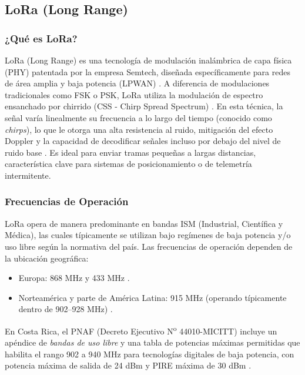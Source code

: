 \documentclass[conference]{IEEEtran}
\begin{document}
\subsection{LoRa (Long Range)}

\subsubsection{¿Qué es LoRa?}
LoRa (Long Range) es una tecnología de modulación inalámbrica de capa física (PHY) patentada por la empresa Semtech, diseñada específicamente para redes de área amplia y baja potencia (LPWAN) \cite{li2024lora,vangelista2019css}. A diferencia de modulaciones tradicionales como FSK o PSK, LoRa utiliza la modulación de espectro ensanchado por chirrido (CSS - Chirp Spread Spectrum) \cite{li2024lora}. En esta técnica, la señal varía linealmente su frecuencia a lo largo del tiempo (conocido como \textit{chirps}), lo que le otorga una alta resistencia al ruido, mitigación del efecto Doppler y la capacidad de decodificar señales incluso por debajo del nivel de ruido base \cite{vangelista2019css,elchalakani2019lora}. Es ideal para enviar tramas pequeñas a largas distancias, característica clave para sistemas de posicionamiento o de telemetría intermitente.

\subsubsection{Frecuencias de Operación}
LoRa opera de manera predominante en bandas ISM (Industrial, Científica y Médica), las cuales típicamente se utilizan bajo regímenes de baja potencia y/o uso libre según la normativa del país. Las frecuencias de operación dependen de la ubicación geográfica:
\begin{itemize}
    \item Europa: 868 MHz y 433 MHz \cite{wang2019investigating}.
    \item Norteamérica y parte de América Latina: 915 MHz (operando típicamente dentro de 902--928 MHz) \cite{wang2019investigating}.
\end{itemize}
En Costa Rica, el PNAF (Decreto Ejecutivo N\textsuperscript{o} 44010-MICITT) incluye un apéndice de \emph{bandas de uso libre} y una tabla de potencias máximas permitidas que habilita el rango 902 a 940 MHz para tecnologías digitales de baja potencia, con potencia máxima de salida de 24 dBm y PIRE máxima de 30 dBm \cite{pnaf_2023_micitt}.
\end{document}
